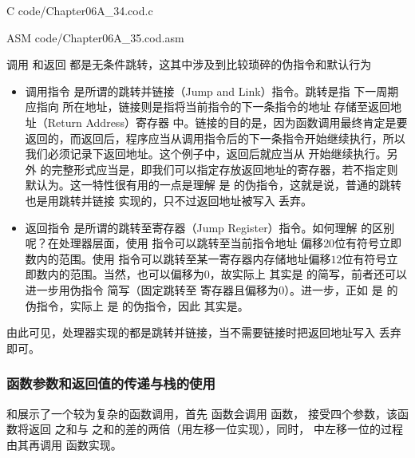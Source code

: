 \begin{Code}{C}
    code/Chapter06A_34.cod.c
\end{Code}

\begin{Code}{ASM}
    code/Chapter06A_35.cod.asm
\end{Code}

调用 和返回 都是无条件跳转，这其中涉及到比较琐碎的伪指令和默认行为
\begin{itemize}
    \item 调用指令 是所谓的跳转并链接（Jump and Link）指令。跳转是指 下一周期应指向 所在地址，链接则是指将当前指令的下一条指令的地址 存储至返回地址（Return Address）寄存器 中。链接的目的是，因为函数调用最终肯定是要返回的，而返回后，程序应当从调用指令后的下一条指令开始继续执行，所以我们必须记录下返回地址。这个例子中，返回后就应当从 开始继续执行。另外 的完整形式应当是，即我们可以指定存放返回地址的寄存器，若不指定则默认为。这一特性很有用的一点是理解 是 的伪指令，这就是说，普通的跳转 也是用跳转并链接 实现的，只不过返回地址被写入 丢弃。
    \item 返回指令 是所谓的跳转至寄存器（Jump Register）指令。如何理解 的区别呢？在处理器层面，使用 指令可以跳转至当前指令地址 偏移$20$位有符号立即数内的范围。使用 指令可以跳转至某一寄存器内存储地址偏移$12$位有符号立即数内的范围。当然，也可以偏移为$0$，故实际上 其实是 的简写，前者还可以进一步用伪指令 简写（固定跳转至 寄存器且偏移为$0$）。进一步，正如 是 的伪指令，实际上 是 的伪指令，因此 其实是。
\end{itemize}

由此可见，处理器实现的都是跳转并链接，当不需要链接时把返回地址写入 丢弃即可。

\subsubsection{函数参数和返回值的传递与栈的使用}
和展示了一个较为复杂的函数调用，首先 函数会调用 函数， 接受四个参数，该函数将返回 之和与 之和的差的两倍（用左移一位实现），同时， 中左移一位的过程由其再调用 函数实现。

